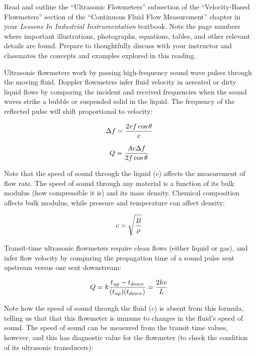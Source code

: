 

Read and outline the ``Ultrasonic Flowmeters'' subsection of the ``Velocity-Based Flowmeters'' section of the ``Continuous Fluid Flow Measurement'' chapter in your {\it Lessons In Industrial Instrumentation} textbook.  Note the page numbers where important illustrations, photographs, equations, tables, and other relevant details are found.  Prepare to thoughtfully discuss with your instructor and classmates the concepts and examples explored in this reading.














Ultrasonic flowmeters work by passing high-frequency sound wave pulses through the moving fluid.  Doppler flowmeters infer fluid velocity in aereated or dirty liquid flows by comparing the incident and received frequencies when the sound waves strike a bubble or suspended solid in the liquid.  The frequency of the reflected pulse will shift proportional to velocity:

$$\Delta f = {{2vf \cos \theta} \over {c}}$$

$$Q = {{Ac \Delta f} \over {2 f \cos \theta}}$$

Note that the speed of sound through the liquid ($c$) affects the measurement of flow rate.  The speed of sound through any material is a function of its bulk modulus (how compressible it is) and its mass density.  Chemical composition affects bulk modulus, while pressure and temperature can affect density:

$$c = \sqrt{B \over \rho}$$

\vskip 10pt

Transit-time ultrasonic flowmeters require clean flows (either liquid or gas), and infer flow velocity by comparing the propagation time of a sound pulse sent upstream versus one sent downstream:

$$Q = k {t_{up} - t_{down} \over (t_{up})(t_{down})} = {2 k v \over L}$$

Note how the speed of sound through the fluid ($c$) is absent from this formula, telling us that that this flowmeter is immune to changes in the fluid's speed of sound.  The speed of sound can be measured from the transit time values, however, and this has diagnostic value for the flowmeter (to check the condition of its ultrasonic transducers):

